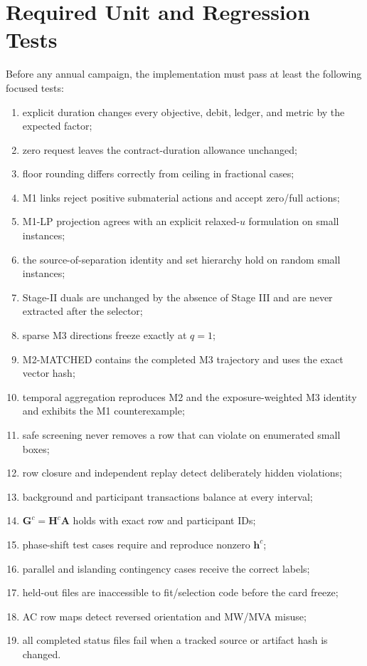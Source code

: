 \documentclass[10pt,journal,onecolumn]{IEEEtran}
\begin{document}
\section{Required Unit and Regression Tests}
\label{app:tests}

Before any annual campaign, the implementation must pass at least the following
focused tests:
\begin{enumerate}[leftmargin=*,itemsep=2pt]
\item explicit duration changes every objective, debit, ledger, and metric by the
expected factor;
\item zero request leaves the contract-duration allowance unchanged;
\item floor rounding differs correctly from ceiling in fractional cases;
\item M1 links reject positive submaterial actions and accept zero/full actions;
\item M1-LP projection agrees with an explicit relaxed-$u$ formulation on small
instances;
\item the source-of-separation identity and set hierarchy hold on random small
instances;
\item Stage-II duals are unchanged by the absence of Stage III and are never
extracted after the selector;
\item sparse M3 directions freeze exactly at $q=1$;
\item M2-MATCHED contains the completed M3 trajectory and uses the exact vector
hash;
\item temporal aggregation reproduces M2 and the exposure-weighted M3 identity
and exhibits the M1 counterexample;
\item safe screening never removes a row that can violate on enumerated small
boxes;
\item row closure and independent replay detect deliberately hidden violations;
\item background and participant transactions balance at every interval;
\item $\bm G^c=\bm H^c\bm A$ holds with exact row and participant IDs;
\item phase-shift test cases require and reproduce nonzero $\bm h^c$;
\item parallel and islanding contingency cases receive the correct labels;
\item held-out files are inaccessible to fit/selection code before the card
freeze;
\item AC row maps detect reversed orientation and MW/MVA misuse;
\item all completed status files fail when a tracked source or artifact hash is
changed.
\end{enumerate}
\end{document}
